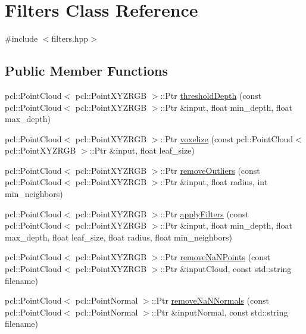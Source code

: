 \hypertarget{class_filters}{}\section{Filters Class Reference}
\label{class_filters}


{\ttfamily \#include $<$filters.\+hpp$>$}

\subsection*{Public Member Functions}
\begin{DoxyCompactItemize}
\item 
pcl\+::\+Point\+Cloud$<$ pcl\+::\+Point\+X\+Y\+Z\+R\+GB $>$\+::Ptr \hyperlink{class_filters_afc0f89a25b158ea0c11025f60fbd9afb}{threshold\+Depth} (const pcl\+::\+Point\+Cloud$<$ pcl\+::\+Point\+X\+Y\+Z\+R\+GB $>$\+::Ptr \&input, float min\+\_\+depth, float max\+\_\+depth)
\item 
pcl\+::\+Point\+Cloud$<$ pcl\+::\+Point\+X\+Y\+Z\+R\+GB $>$\+::Ptr \hyperlink{class_filters_a0435083e1ecca7c1a3d8883f241c4225}{voxelize} (const pcl\+::\+Point\+Cloud$<$ pcl\+::\+Point\+X\+Y\+Z\+R\+GB $>$\+::Ptr \&input, float leaf\+\_\+size)
\item 
pcl\+::\+Point\+Cloud$<$ pcl\+::\+Point\+X\+Y\+Z\+R\+GB $>$\+::Ptr \hyperlink{class_filters_aade8ae78e3f5490db23213b8fc63215b}{remove\+Outliers} (const pcl\+::\+Point\+Cloud$<$ pcl\+::\+Point\+X\+Y\+Z\+R\+GB $>$\+::Ptr \&input, float radius, int min\+\_\+neighbors)
\item 
pcl\+::\+Point\+Cloud$<$ pcl\+::\+Point\+X\+Y\+Z\+R\+GB $>$\+::Ptr \hyperlink{class_filters_a05f3f0a4f537fe94b8f06b9b8b94d48d}{apply\+Filters} (const pcl\+::\+Point\+Cloud$<$ pcl\+::\+Point\+X\+Y\+Z\+R\+GB $>$\+::Ptr \&input, float min\+\_\+depth, float max\+\_\+depth, float leaf\+\_\+size, float radius, float min\+\_\+neighbors)
\item 
pcl\+::\+Point\+Cloud$<$ pcl\+::\+Point\+X\+Y\+Z\+R\+GB $>$\+::Ptr \hyperlink{class_filters_a478cc3062b2a6fff3c2430cb10c86aba}{remove\+Na\+N\+Points} (const pcl\+::\+Point\+Cloud$<$ pcl\+::\+Point\+X\+Y\+Z\+R\+GB $>$\+::Ptr \&input\+Cloud, const std\+::string filename)
\item 
pcl\+::\+Point\+Cloud$<$ pcl\+::\+Point\+Normal $>$\+::Ptr \hyperlink{class_filters_a67a7521cd9568277a9285f214e282a7f}{remove\+Na\+N\+Normals} (const pcl\+::\+Point\+Cloud$<$ pcl\+::\+Point\+Normal $>$\+::Ptr \&input\+Normal, const std\+::string filename)
\end{DoxyCompactItemize}


